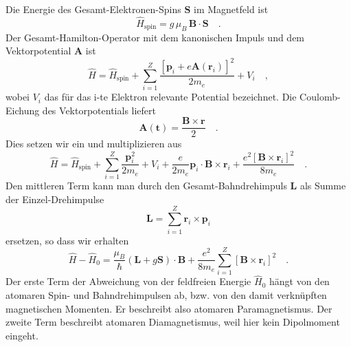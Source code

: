 Die Energie des Gesamt-Elektronen-Spins $\bm{S}$  im Magnetfeld ist
\begin{equation}
    \hat{H}_\text{spin} = g \, \mu_B \, \bm{B} \cdot \bm{S} \quad .
\end{equation}
Der Gesamt-Hamilton-Operator  mit dem kanonischen Impuls und dem Vektorpotential $\bm{A}$ ist
\begin{equation}
    \hat{H} = \hat{H}_\text{spin} + \sum_{i=1}^Z \frac{ 
        \left[ \bm{p}_i + e \bm{A}(\bm{r}_i) \right]^2}{2 m_e} + V_i \quad ,
\end{equation}
wobei $V_i$ das für das i-te Elektron relevante Potential bezeichnet. Die Coulomb-Eichung des Vektorpotentials liefert
\begin{equation}
    \bm{A}(\bm{t}) = \frac{\bm{B} \times \bm{r}}{2} \quad .
\end{equation}
Dies setzen wir ein und multiplizieren aus
\begin{equation}
    \hat{H} = \hat{H}_\text{spin} + \sum_{i=1}^Z
    \frac{ \bm{p}_i^2}{2 m_e} + V_i
+   \frac{ e}{2 m_e} \bm{p}_i  \cdot \bm{B} \times \bm{r}_i
+    \frac{e^2 \left[\bm{B} \times \bm{r}_i \right]^2}{8 m_e}  \quad .
\end{equation}
Den mittleren Term kann man durch den  Gesamt-Bahndrehimpuls $\bm{L}$ als  Summe der Einzel-Drehimpulse
\begin{equation}
    \bm{L} = \sum_{i=1}^Z \bm{r}_i \times \bm{p}_i
 \end{equation}
 ersetzen, so dass wir erhalten
 \begin{equation}
    \hat{H} - \hat{H}_0 = 
    \frac{\mu_B}{\hbar} (\bm{L} + g\bm{S}) \cdot \bm{B}
    + \frac{e^2}{8 m_e} 
     \sum_{i=1}^Z  \left[\bm{B} \times \bm{r}_i \right]^2 \quad . \label{eq:7_H_atom_para_dia}
\end{equation}
Der erste Term der Abweichung von der feldfreien Energie $\hat{H}_0$ hängt von den atomaren Spin- und Bahndrehimpulsen ab, bzw. von den damit verknüpften magnetischen Momenten. Er beschreibt also atomaren Paramagnetismus. Der zweite Term beschreibt atomaren Diamagnetismus, weil hier kein Dipolmoment eingeht.

